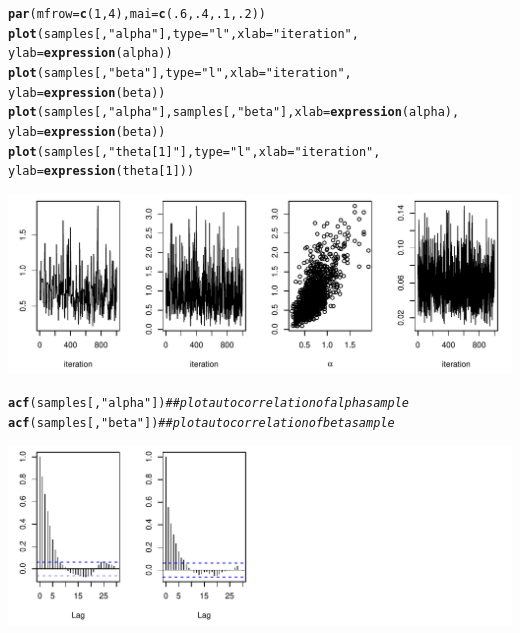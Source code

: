 \documentclass[12pt,oneside]{book}\usepackage[]{graphicx}\usepackage[]{color}
\makeatletter
\def\maxwidth{ %
  \ifdim\Gin@nat@width>\linewidth
    \linewidth
  \else
    \Gin@nat@width
  \fi
}
\newcommand{\hlnum}[1]{\textcolor[rgb]{0.686,0.059,0.569}{#1}}%
\newcommand{\hlstr}[1]{\textcolor[rgb]{0.192,0.494,0.8}{#1}}%
\newcommand{\hlcom}[1]{\textcolor[rgb]{0.678,0.584,0.686}{\textit{#1}}}%
\newcommand{\hlstd}[1]{\textcolor[rgb]{0.345,0.345,0.345}{#1}}%
\newcommand{\hlkwc}[1]{\textcolor[rgb]{0.333,0.667,0.333}{#1}}%
\newcommand{\hlkwd}[1]{\textcolor[rgb]{0.737,0.353,0.396}{\textbf{#1}}}%
\newenvironment{kframe}{%
 \def\at@end@of@kframe{}%
 \ifinner\ifhmode%
  \def\at@end@of@kframe{\end{minipage}}%
  \begin{minipage}{\columnwidth}%
 \fi\fi%
 \def\FrameCommand##1{\hskip\@totalleftmargin \hskip-\fboxsep
 \colorbox{shadecolor}{##1}\hskip-\fboxsep
     \hskip-\linewidth \hskip-\@totalleftmargin \hskip\columnwidth}%
 \MakeFramed {\advance\hsize-\width
   \@totalleftmargin\z@ \linewidth\hsize
   \@setminipage}}%
 {\par\unskip\endMakeFramed%
 \at@end@of@kframe}
\newenvironment{knitrout}{}{} %
\makeatother
\begin{document}
\begin{knitrout}
\begin{kframe}
\begin{alltt}
\hlkwd{par}\hlstd{(}\hlkwc{mfrow} \hlstd{=} \hlkwd{c}\hlstd{(}\hlnum{1}\hlstd{,} \hlnum{4}\hlstd{),} \hlkwc{mai} \hlstd{=} \hlkwd{c}\hlstd{(}\hlnum{.6}\hlstd{,} \hlnum{.4}\hlstd{,} \hlnum{.1}\hlstd{,} \hlnum{.2}\hlstd{))}
\hlkwd{plot}\hlstd{(samples[ ,} \hlstr{"alpha"}\hlstd{],} \hlkwc{type} \hlstd{=} \hlstr{"l"}\hlstd{,} \hlkwc{xlab} \hlstd{=} \hlstr{"iteration"}\hlstd{,}
     \hlkwc{ylab} \hlstd{=} \hlkwd{expression}\hlstd{(alpha))}
\hlkwd{plot}\hlstd{(samples[ ,} \hlstr{"beta"}\hlstd{],} \hlkwc{type} \hlstd{=} \hlstr{"l"}\hlstd{,} \hlkwc{xlab} \hlstd{=} \hlstr{"iteration"}\hlstd{,}
     \hlkwc{ylab} \hlstd{=} \hlkwd{expression}\hlstd{(beta))}
\hlkwd{plot}\hlstd{(samples[ ,} \hlstr{"alpha"}\hlstd{], samples[ ,} \hlstr{"beta"}\hlstd{],} \hlkwc{xlab} \hlstd{=} \hlkwd{expression}\hlstd{(alpha),}
     \hlkwc{ylab} \hlstd{=} \hlkwd{expression}\hlstd{(beta))}
\hlkwd{plot}\hlstd{(samples[ ,} \hlstr{"theta[1]"}\hlstd{],} \hlkwc{type} \hlstd{=} \hlstr{"l"}\hlstd{,} \hlkwc{xlab} \hlstd{=} \hlstr{"iteration"}\hlstd{,}
     \hlkwc{ylab} \hlstd{=} \hlkwd{expression}\hlstd{(theta[}\hlnum{1}\hlstd{]))}
\end{alltt}
\end{kframe}
\includegraphics[width=\maxwidth]{figure/mcmcPump-1} 
\begin{kframe}\begin{alltt}
\hlkwd{acf}\hlstd{(samples[,} \hlstr{"alpha"}\hlstd{])} \hlcom{## plot autocorrelation of alpha sample}
\hlkwd{acf}\hlstd{(samples[,} \hlstr{"beta"}\hlstd{])}  \hlcom{## plot autocorrelation of beta  sample}
\end{alltt}
\end{kframe}
\includegraphics[width=\maxwidth]{figure/mcmcPump-2} 

\end{knitrout}
\end{document}
